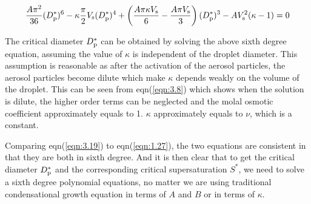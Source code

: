 \documentclass[12pt]{article}
\begin{document}
\begin{equation}\label{eqn:3.19}
\frac{A\pi^2}{36}(D_{\rm p}^{*})^{6}-\kappa\frac{\pi}{2}V_{\rm s}(D_{\rm p}^{*})^4+\left(\frac{A\pi \kappa V_{\rm s}}{6}-\frac{A\pi V_{\rm s}}{3}\right)(D_{\rm p}^{*})^{3} -A V_{\rm s}^2(\kappa -1) =0
\end{equation}

The critical diameter $D_{\rm p}^{*}$ can be obtained by solving the above sixth degree equation, assuming the value of $\kappa$ is independent of the droplet diameter. This assumption is reasonable as after the activation of the aerosol particles, the aerosol particles become dilute which make $\kappa$ depends weakly on the volume of the droplet. This can be seen from eqn(\ref{eqn:3.8}) which shows when the solution is dilute, the higher order terms can be neglected and the molal osmotic coefficient approximately equals to 1. $\kappa$  approximately equals to $\nu$, which is a constant.

Comparing eqn(\ref{eqn:3.19}) to eqn(\ref{eqn:1.27}), the two equations are consistent in that they are both in sixth degree. And it is then clear that to get the critical diameter $D_{\rm p}^{*}$ and the corresponding critical supersaturation $S^{*}$, we need to solve a sixth degree polynomial equations, no matter we are using traditional condensational growth equation in terms of $A$ and $B$ or in terms of $\kappa$.  







\end{document}
